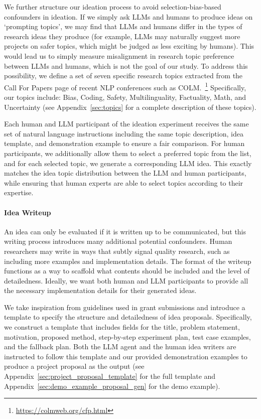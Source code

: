 We further structure our ideation process to avoid selection-bias-based confounders in ideation. If we simply ask LLMs and humans to produce ideas on `prompting topics', we may find that LLMs and humans differ in the types of research ideas they produce (for example, LLMs may naturally suggest more projects on safer topics, which might be judged as less exciting by humans). This would lead us to simply measure misalignment in research topic preference between LLMs and humans, which is not the goal of our study. To address this possibility, we define a set of seven specific research topics extracted from the Call For Papers page of recent NLP conferences such as COLM.~\footnote{\url{https://colmweb.org/cfp.html}} Specifically, our topics include: Bias, Coding, Safety, Multilinguality, Factuality, Math, and Uncertainty (see Appendix~\ref{sec:topics} for a complete description of these topics).

Each human and LLM participant of the ideation experiment receives the same set of natural language instructions including the same topic description, idea template, and demonstration example to ensure a fair comparison. For human participants, we additionally allow them to select a preferred topic from the list, and for each selected topic, we generate a corresponding LLM idea. This exactly matches the idea topic distribution between the LLM and human participants, while ensuring that human experts are able to select topics according to their expertise.


\paragraph{Idea Writeup}
An idea can only be evaluated if it is written up to be communicated, but this writing process introduces many additional potential confounders. Human researchers may write in ways that subtly signal quality research, such as including more examples and implementation details. 
The format of the writeup functions as a way to scaffold what contents should be included and the level of detailedness. 
Ideally, we want both human and LLM participants to provide all the necessary implementation details for their generated ideas. 


We take inspiration from guidelines used in grant submissions and introduce a template to specify the structure and detailedness of idea proposals. Specifically, we construct a template that includes fields for the title, problem statement, motivation, proposed method, step-by-step experiment plan, test case examples, and the fallback plan. 
Both the LLM agent and the human idea writers are instructed to follow this template and our provided demonstration examples to produce a project proposal as the output (see Appendix~\ref{sec:project_proposal_template} for the full template and Appendix~\ref{sec:demo_example_proposal_gen} for the demo example).
%

